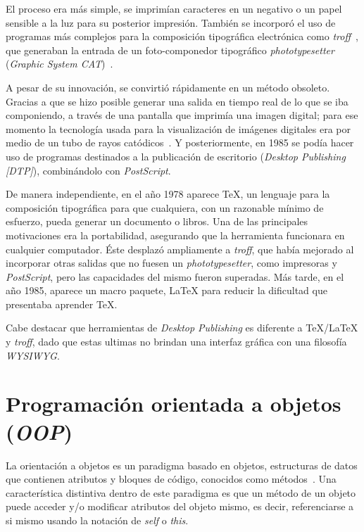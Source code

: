 \documentclass[12pt,letterpaper,titlepage,oneside,openright]{book}
\newcommand{\latex}{\LaTeX\xspace}
\newcommand{\tex}{\TeX\xspace}
\begin{document}
El proceso era más simple, se imprimían caracteres en un negativo o un papel sensible a la luz para su posterior impresión. También se incorporó el uso de programas más complejos para la composición tipográfica electrónica como \textit{troff}~\cite{webtroffhp}, que generaban la entrada de un foto-componedor tipográfico \textit{phototypesetter} (\textit{Graphic System CAT})~\cite{thompson1980exp}.

A pesar de su innovación, se convirtió rápidamente en un método obsoleto. Gracias a que se hizo posible generar una salida en tiempo real de lo que se iba componiendo, a través de una pantalla que imprimía una imagen digital; para ese momento la tecnología usada para la visualización de imágenes digitales era por medio de un tubo de rayos catódicos~\cite{zadeh1977encyclopedia}. Y posteriormente, en 1985 se podía hacer uso de programas destinados a la publicación de escritorio (\textit{Desktop Publishing [DTP]}), combinándolo con \textit{{PostScript}}.

De manera independiente, en el año 1978 aparece \tex, un lenguaje para la composición tipográfica para que cualquiera, con un razonable mínimo de esfuerzo, pueda generar un documento o libros. Una de las principales motivaciones era la portabilidad, asegurando que la herramienta funcionara en cualquier computador. Éste desplazó ampliamente a \textit{troff}, que había mejorado al incorporar otras salidas que no fuesen un \textit{phototypesetter}, como impresoras y \textit{PostScript}, pero las capacidades del mismo fueron superadas. Más tarde, en el año 1985, aparece un macro paquete, \latex para reducir la dificultad que presentaba aprender \tex.

Cabe destacar que herramientas de \textit{Desktop Publishing} es diferente a \tex/\latex y \textit{troff}, dado que estas ultimas no brindan una interfaz gráfica con una filosofía \textit{WYSIWYG}.

\section{Programación orientada a objetos (\textit{OOP})}

La orientación a objetos es un paradigma basado en objetos, estructuras de datos que contienen atributos y bloques de código, conocidos como métodos~\cite{bruce2002foundations}. Una característica distintiva dentro de este paradigma es que un método de un objeto puede acceder y/o modificar atributos del objeto mismo, es decir, referenciarse a si mismo usando la notación de \textit{self} o \textit{this}.
\end{document}

